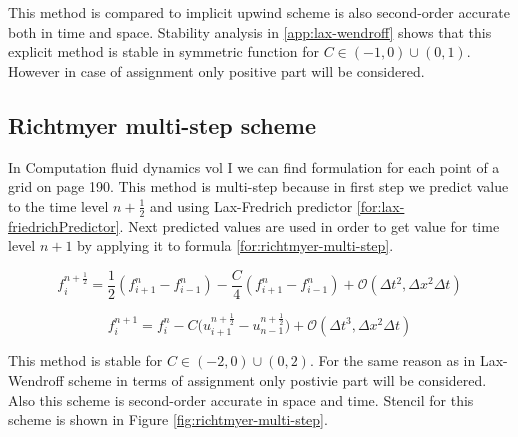 			This method is compared to implicit upwind scheme is also second-order accurate both in time and space. Stability analysis in \ref{app:lax-wendroff} shows that this explicit method is stable in symmetric function for $C \in (-1, 0) \cup (0, 1)$. However in case of assignment only positive part will be considered.
			
		\subsection{Richtmyer multi-step scheme}
			In Computation fluid dynamics vol I\cite{bib:hoffman} we can find formulation for each point of a grid on page 190. This method is multi-step because in first step we predict value to the time level $n + \frac{1}{2}$ and using Lax-Fredrich predictor \ref{for:lax-friedrichPredictor}. Next predicted values are used in order to get value for time level $n+1$ by applying it to formula \ref{for:richtmyer-multi-step}.
			
			\begin{equation}
				\label{for:lax-friedrichPredictor}
				f_{i}^{n+\frac{1}{2}} = \frac{1}{2} (f_{i+1}^n - f_{i-1}^n) - \frac{C}{4}(f_{i+1}^n - f_{i-1}^n) + \mathcal{O}(\Delta t^2, \Delta x^2\Delta t)
			\end{equation}
			
			\begin{equation}
				\label{for:richtmyer-multi-step}
				f_i^{n+1} = f_i^n - C\Big(u_{i+1}^{n+\frac{1}{2}} - u_{n-1}^{n+\frac{1}{2}}\Big) + \mathcal{O} (\Delta t^3, \Delta x^2\Delta t)
			\end{equation}
			
			This method is stable for $C \in (-2, 0) \cup (0, 2)$. For the same reason as in Lax-Wendroff scheme in terms of assignment only postivie part will be considered. Also this scheme is second-order accurate in space and time. Stencil for this scheme is shown in Figure \ref{fig:richtmyer-multi-step}.
			
